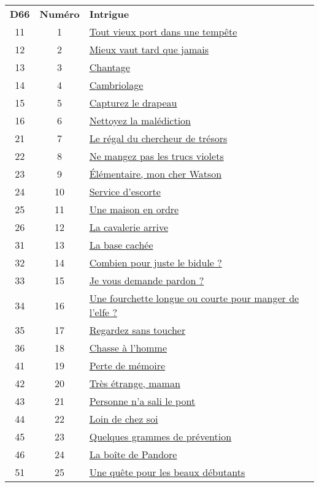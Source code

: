 \begin{center}
\begin{tabular}{ccl}
\textbf{D66} & \textbf{Numéro} & \textbf{Intrigue} \\
11 & 1 & \hyperlink{port}{Tout vieux port dans une tempête} \\
12 & 2 & \hyperlink{mieuxvaut}{Mieux vaut tard que jamais} \\
13 & 3 & \hyperlink{chantage}{Chantage} \\
14 & 4 & \hyperlink{cambriolage}{Cambriolage} \\
15 & 5 & \hyperlink{drapeau}{Capturez le drapeau} \\
16 & 6 & \hyperlink{malediction}{Nettoyez la malédiction} \\
21 & 7 & \hyperlink{tresor}{Le régal du chercheur de trésors} \\
22 & 8 & \hyperlink{violet}{Ne mangez pas les trucs violets} \\
23 & 9 & \hyperlink{watson}{Élémentaire, mon cher Watson} \\
24 & 10 & \hyperlink{escorte}{Service d’escorte} \\
25 & 11 & \hyperlink{maison}{Une maison en ordre} \\
26 & 12 & \hyperlink{cavalerie}{La cavalerie arrive} \\
31 & 13 & \hyperlink{base}{La base cachée} \\
32 & 14 & \hyperlink{bidule}{Combien pour juste le bidule ?} \\
33 & 15 & \hyperlink{pardon}{Je vous demande pardon ?} \\
34 & 16 & \hyperlink{elfe}{Une fourchette longue ou courte pour manger de l'elfe ?} \\
35 & 17 & \hyperlink{regardez}{Regardez sans toucher} \\
36 & 18 & \hyperlink{chasse}{Chasse à l'homme} \\
41 & 19 & \hyperlink{memoire}{Perte de mémoire} \\
42 & 20 & \hyperlink{etrange}{Très étrange, maman} \\
43 & 21 & \hyperlink{pont}{Personne n'a sali le pont} \\
44 & 22 & \hyperlink{loin}{Loin de chez soi} \\
45 & 23 & \hyperlink{prevention}{Quelques grammes de prévention} \\
46 & 24 & \hyperlink{pandore}{La boîte de Pandore} \\
51 & 25 & \hyperlink{debutant}{Une quête pour les beaux débutants} \\

\end{tabular}
\end{center}
